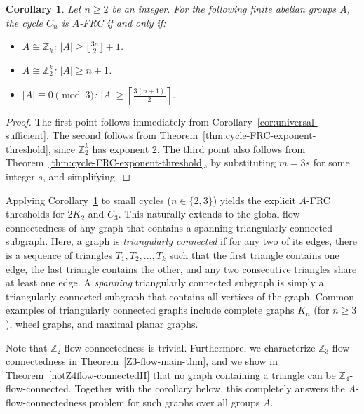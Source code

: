 \documentclass[a4paper,12pt]{article}
\theoremstyle{plain}
\newtheorem{corollary}[theorem]{Corollary}
\theoremstyle{definition}
\newcommand{\Z}{\mathbb{Z}}
\renewcommand\ge\geqslant
\begin{document}
\begin{corollary}\label{cor:specific-groups}
    Let $n \ge 2$ be an integer. For the following finite abelian groups $A$, the cycle $C_n$ is $A$-FRC if and only if:
    \begin{itemize}
        \item $A \cong \mathbb{Z}_k$: \quad $|A| \ge \lfloor \frac{3n}{2} \rfloor + 1$.
        \item $A \cong \mathbb{Z}_2^k$: \quad $|A| \ge n + 1$. 
        \item $|A| \equiv 0 \pmod 3$: \quad $|A| \ge \left\lceil \frac{3(n+1)}{2} \right\rceil$.
    \end{itemize}
\end{corollary}
\begin{proof}
   The first point follows immediately from  
   Corollary~\ref{cor:universal-sufficient}.  The second follows from 
   Theorem~\ref{thm:cycle-FRC-exponent-threshold}, since $\Z_2^k$ has exponent $2$.
   The third point also follows from 
   Theorem~\ref{thm:cycle-FRC-exponent-threshold}, by substituting $m=3s$ for some integer $s$, and simplifying.
\end{proof}

Applying Corollary~\ref{cor:specific-groups} to small cycles ($n\in\{2, 3\}$) yields the explicit $A$-FRC thresholds for $2K_2$ and $C_3$. This naturally extends to the global flow-connectedness of any graph that contains a spanning triangularly connected subgraph. 
%
Here, a graph is \emph{triangularly connected} if for any two of its edges, there is a sequence of triangles $T_1, T_2, \dots, T_k$ such that the first triangle contains one edge, the last triangle contains the other, and any two consecutive triangles share at least one edge. A \emph{spanning} triangularly connected subgraph is simply a triangularly connected subgraph that contains all vertices of the graph. Common examples of triangularly connected graphs include complete graphs $K_n$ (for $n \ge 3$), wheel graphs, and maximal planar graphs. 

Note that $\mathbb{Z}_2$-flow-connectedness is trivial. Furthermore, we characterize $\mathbb{Z}_3$-flow-connectedness in Theorem~\ref{Z3-flow-main-thm}, and we show in Theorem~\ref{notZ4flow-connectedII} that no graph containing a triangle can be $\mathbb{Z}_4$-flow-connected. Together with the corollary below, this completely answers the $A$-flow-connectedness problem for such graphs over all groups $A$.
\end{document}
